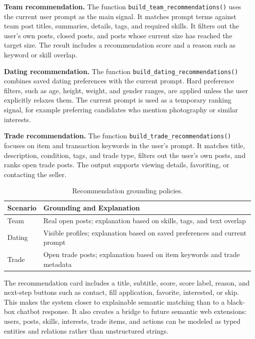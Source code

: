 \documentclass[twocolumn]{article}
\begin{document}
\textbf{Team recommendation.} The function \texttt{build\_team\_recommendations()} uses the current user prompt as the main signal. It matches prompt terms against team post titles, summaries, details, tags, and required skills. It filters out the user's own posts, closed posts, and posts whose current size has reached the target size. The result includes a recommendation score and a reason such as keyword or skill overlap.

\textbf{Dating recommendation.} The function \texttt{build\_dating\_recommendations()} combines saved dating preferences with the current prompt. Hard preference filters, such as age, height, weight, and gender ranges, are applied unless the user explicitly relaxes them. The current prompt is used as a temporary ranking signal, for example preferring candidates who mention photography or similar interests.

\textbf{Trade recommendation.} The function \texttt{build\_trade\_recommendations()} focuses on item and transaction keywords in the user's prompt. It matches title, description, condition, tags, and trade type, filters out the user's own posts, and ranks open trade posts. The output supports viewing details, favoriting, or contacting the seller.

\begin{table}[t]
\centering
\caption{Recommendation grounding policies.}
\label{tab:recommendations}
\begin{tabularx}{\linewidth}{lX}
\toprule
\textbf{Scenario} & \textbf{Grounding and Explanation}\\
\midrule
Team & Real open posts; explanation based on skills, tags, and text overlap\\
Dating & Visible profiles; explanation based on saved preferences and current prompt\\
Trade & Open trade posts; explanation based on item keywords and trade metadata\\
\bottomrule
\end{tabularx}
\end{table}

The recommendation card includes a title, subtitle, score, score label, reason, and next-step buttons such as contact, fill application, favorite, interested, or skip. This makes the system closer to explainable semantic matching than to a black-box chatbot response. It also creates a bridge to future semantic web extensions: users, posts, skills, interests, trade items, and actions can be modeled as typed entities and relations rather than unstructured strings.
\end{document}
